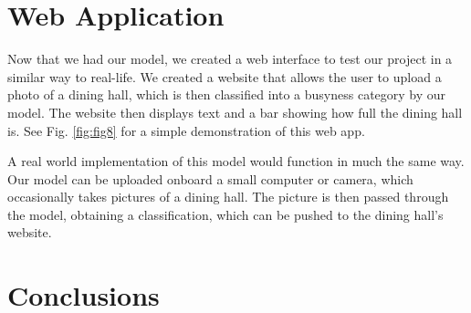 \documentclass{article}
\begin{document}
\begin{multicols}{2}
\section*{Web Application}
Now that we had our model, we created a web interface to test our project in a similar way to real-life. We created a website that allows the user to upload a photo of a dining hall, which is then classified into a busyness category by our model. The website then displays text and a bar showing how full the dining hall is. See Fig. \ref{fig:fig8} for a simple demonstration of this web app.

A real world implementation of this model would function in much the same way. Our model can be uploaded onboard a small computer or camera, which occasionally takes pictures of a dining hall. The picture is then passed through the model, obtaining a classification, which can be pushed to the dining hall’s website. 

\section*{Conclusions}


\end{multicols}
\end{document}
